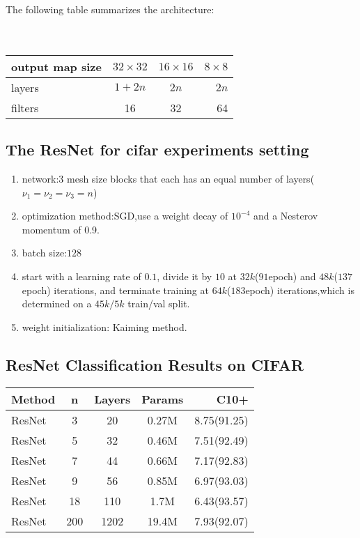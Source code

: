 The following table summarizes the architecture:\\
\\ \hspace*{\fill} \\
\begin{tabular}{| l | c | c | r |}
\hline
output map size &  $32\times 32$  & $16\times 16$  & $8\times 8$ \\
\hline
layers          &    $1+2n$       &   $2n$         &   $2n$      \\
\hline
filters         &       16        &     32         &     64      \\
\hline
\end{tabular}


\subsection{The ResNet for cifar experiments setting}
\begin{enumerate}
\item network:3 mesh size blocks that each has an equal number of layers($\nu_1=\nu_2=\nu_3=n$)
\item optimization method:SGD,use a weight decay of $10^{-4}$ and a Nesterov momentum of 0.9.
\item batch size:$128$
\item start with a learning rate of $0.1$, divide it by $10$ at $32k$($91$epoch) and $48k$($137$epoch) iterations, and terminate training at $64k$($183$epoch) iterations,which is determined on a $45k/5k$ train/val split.
\item weight initialization: Kaiming method.
\end{enumerate}

\subsection{ResNet Classification Results on CIFAR}
\begin{tabular}{| l | c | c | c | r |}
\hline
Method    &   n   & Layers   & Params   & C10+        \\
\hline
ResNet    &   3   &   20     &  0.27M   & 8.75(91.25)  \\  
\hline
ResNet    &   5   &   32     &  0.46M   & 7.51(92.49)  \\ 
\hline
ResNet    &   7   &   44     &  0.66M   & 7.17(92.83)  \\ 
\hline
ResNet    &   9   &   56     &  0.85M   & 6.97(93.03)  \\ 
\hline
ResNet    &   18  &   110    &  1.7M    & 6.43(93.57)  \\    
\hline
ResNet    &   200 &   1202   &  19.4M   & 7.93(92.07)  \\ 
\hline        
\end{tabular}